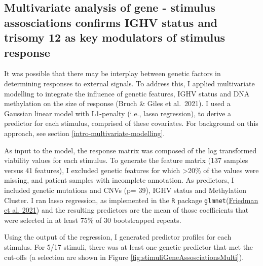 \documentclass[11pt, a4paper, twosided]{book}
\begin{document}
\hypertarget{multivariate-gene-stimulus-assosciations}{%
\subsection{Multivariate analysis of gene - stimulus assosciations confirms IGHV status and trisomy 12 as key modulators of stimulus response}\label{multivariate-gene-stimulus-assosciations}}

It was possible that there may be interplay between genetic factors in determining responses to external signals. To address this, I applied multivariate modelling to integrate the influence of genetic features, IGHV status and DNA methylation on the size of response (Bruch \& Giles et al.~2021). I used a Gaussian linear model with L1-penalty (i.e., lasso regression), to derive a predictor for each stimulus, comprised of these covariates. For background on this approach, see section \ref{intro-multivariate-modelling}.

As input to the model, the response matrix was composed of the log transformed viability values for each stimulus. To generate the feature matrix (137 samples versus 41 features), I excluded genetic features for which \textgreater20\% of the values were missing, and patient samples with incomplete annotation. As predictors, I included genetic mutations and CNVs (p= 39), IGHV status and Methylation Cluster. I ran lasso regression, as implemented in the \texttt{R} package \texttt{glmnet}(\protect\hyperlink{ref-R-glmnet}{Friedman et al. 2021}) and the resulting predictors are the mean of those coefficients that were selected in at least 75\% of 30 bootstrapped repeats.

Using the output of the regression, I generated predictor profiles for each stimulus. For 5/17 stimuli, there was at least one genetic predictor that met the cut-offs (a selection are shown in Figure \ref{fig:stimuliGeneAssosciationsMulti}).
\end{document}
